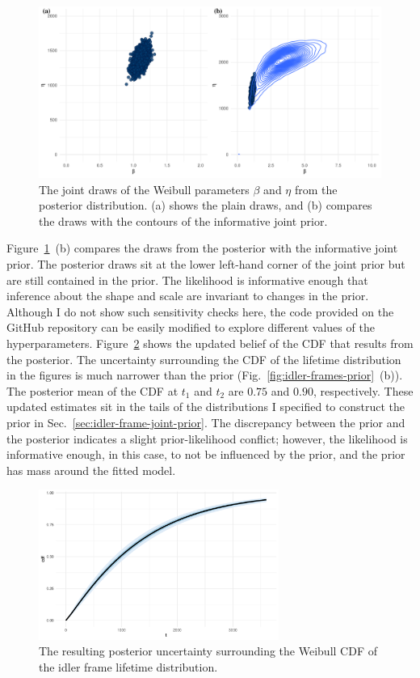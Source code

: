 \begin{figure}[t]
  \centering
  \includegraphics[width=1\textwidth]{./figures/ch-3/idler-frame-post.pdf}
  \caption{The joint draws of the Weibull parameters $\beta$ and $\eta$ from the posterior distribution. (a) shows the plain draws, and (b) compares the draws with the contours of the informative joint prior.}
  \label{fig:idler-frames-post}
\end{figure}

Figure~\ref{fig:idler-frames-post}~(b) compares the draws from the posterior with the informative joint prior. The posterior draws sit at the lower left-hand corner of the joint prior but are still contained in the prior. The likelihood is informative enough that inference about the shape and scale are invariant to changes in the prior. Although I do not show such sensitivity checks here, the code provided on the GitHub repository can be easily modified to explore different values of the hyperparameters. Figure~\ref{fig:idler-frames-post-cdf} shows the updated belief of the CDF that results from the posterior. The uncertainty surrounding the CDF of the lifetime distribution in the figures is much narrower than the prior (Fig.~\ref{fig:idler-frames-prior}~(b)). The posterior mean of the CDF at $t_1$ and $t_2$ are $0.75$ and $0.90$, respectively. These updated estimates sit in the tails of the distributions I specified to construct the prior in Sec.~\ref{sec:idler-frame-joint-prior}. The discrepancy between the prior and the posterior indicates a slight prior-likelihood conflict; however, the likelihood is informative enough, in this case, to not be influenced by the prior, and the prior has mass around the fitted model.

\begin{figure}[t]
  \centering
  \includegraphics[width=0.7\textwidth]{./figures/ch-3/idler-frame-post-CDF.pdf}
  \caption{The resulting posterior uncertainty surrounding the Weibull CDF of the idler frame lifetime distribution.}
  \label{fig:idler-frames-post-cdf}
\end{figure}

